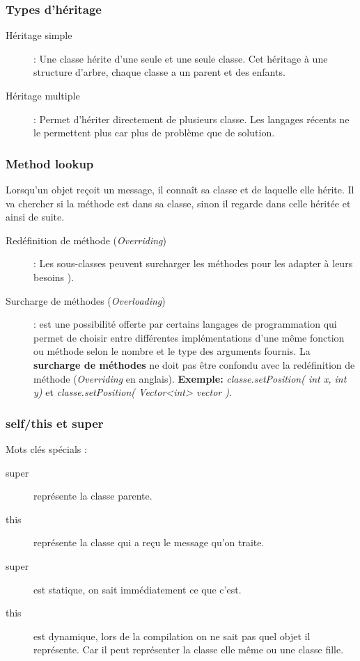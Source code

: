 \subsubsection{Types d’héritage}
\begin{description}
	\item [Héritage simple]: Une classe hérite d’une seule et une seule classe. Cet héritage à une structure d’arbre, chaque classe a un parent et des enfants.
	\item [Héritage multiple]: Permet d’hériter directement de plusieurs classe. Les langages récents ne le permettent plus car plus de problème que de solution.
\end{description}



\subsubsection{Method lookup}
Lorsqu’un objet reçoit un message, il connaît sa classe et de laquelle elle hérite. Il va chercher si la méthode est dans sa classe, sinon il regarde dans celle héritée et ainsi de suite.
\begin{description}
    \item [Redéfinition de méthode (\textit{Overriding})]: Les sous-classes peuvent surcharger les méthodes pour les adapter à leurs besoins ).
    \item [Surcharge de méthodes (\textit{Overloading})]: est une possibilité offerte par certains langages de programmation qui permet de choisir entre différentes implémentations d'une même fonction ou méthode selon le nombre et le type des arguments fournis. La \textbf{surcharge de méthodes} ne doit pas être confondu avec la redéfinition de méthode (\textit{Overriding} en anglais). \textbf{Exemple:} \textit{classe.setPosition( int x, int y)} et \textit{classe.setPosition( Vector<int> vector )}. 
\end{description}


\subsubsection{self/this et super}
Mots clés spécials :
\begin{description}
    \item [super] représente la classe parente.
	\item [this] représente la classe qui a reçu le message qu’on traite.

	\item [super] est statique, on sait immédiatement ce que c’est.
	\item [this] est dynamique, lors de la compilation on ne sait pas quel objet il représente. Car il peut représenter la classe elle même ou une classe fille.
\end{description}



